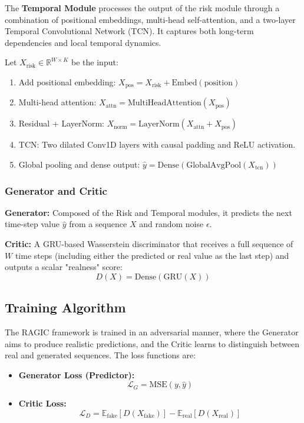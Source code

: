 The \textbf{Temporal Module} processes the output of the risk module through a combination of positional embeddings, multi-head self-attention, and a two-layer Temporal Convolutional Network (TCN). It captures both long-term dependencies and local temporal dynamics.

Let $X_{\text{risk}} \in \mathbb{R}^{W \times K}$ be the input:
\begin{enumerate}
    \item Add positional embedding: $X_{\text{pos}} = X_{\text{risk}} + \text{Embed}(\text{position})$
    \item Multi-head attention: $X_{\text{attn}} = \text{MultiHeadAttention}(X_{\text{pos}})$
    \item Residual + LayerNorm: $X_{\text{norm}} = \text{LayerNorm}(X_{\text{attn}} + X_{\text{pos}})$
    \item TCN: Two dilated Conv1D layers with causal padding and ReLU activation.
    \item Global pooling and dense output: $\hat{y} = \text{Dense}( \text{GlobalAvgPool}(X_{\text{tcn}}) )$
\end{enumerate}

\subsubsection{Generator and Critic}

\textbf{Generator:} Composed of the Risk and Temporal modules, it predicts the next time-step value $\hat{y}$ from a sequence $X$ and random noise $\epsilon$.

\textbf{Critic:} A GRU-based Wasserstein discriminator that receives a full sequence of $W$ time steps (including either the predicted or real value as the last step) and outputs a scalar "realness" score:
\[
D(X) = \text{Dense}(\text{GRU}(X))
\]

\subsection{Training Algorithm}

The RAGIC framework is trained in an adversarial manner, where the Generator aims to produce realistic predictions, and the Critic learns to distinguish between real and generated sequences. The loss functions are:

\begin{itemize}
    \item \textbf{Generator Loss (Predictor):}
    \[
    \mathcal{L}_G = \text{MSE}(y, \hat{y})
    \]
    
    \item \textbf{Critic Loss:}
    \[
    \mathcal{L}_D = \mathbb{E}_{\text{fake}}[D(X_{\text{fake}})] - \mathbb{E}_{\text{real}}[D(X_{\text{real}})]
    \]
\end{itemize}

